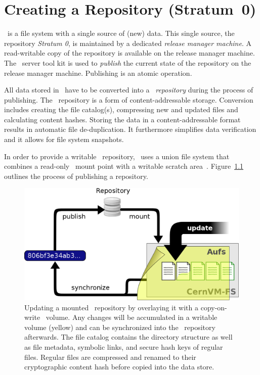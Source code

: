 \chapter{Creating a Repository (Stratum~0)}
\label{sct:createrepo}

\cvmfs\ is a file system with a single source of (new) data.
This single source, the repository \emph{Stratum 0}, is maintained by a dedicated \emph{release manager machine}.
A read-writable copy of the repository is available on the release manager machine.
The \cvmfs\ server tool kit is used to \emph{publish} the current state of the repository on the release manager machine.
Publishing is an atomic operation.

All data stored in \cvmfs\ have to be converted into a \cvmfs\ \emph{repository} during the process of publishing.
The \cvmfs\ repository is a form of content-addressable storage.
Conversion includes creating the file catalog(s), compressing new and updated files and calculating content hashes.
Storing the data in a content-addressable format results in automatic file de-duplication.
It furthermore simplifies data verification and it allows for file system snapshots.

In order to provide a writable \cvmfs\ repository, \cvmfs\ uses a union file system that combines a read-only \cvmfs\ mount point with a writable scratch area~\cite{unionfs04,aufs}.
Figure~\ref{fig:installwebserver} outlines the process of publishing a repository.

\begin{figure}[h]
	\includegraphics[width=\textwidth]{figures/update_process.png}
	\caption{Updating a mounted \cvmfs\ repository by overlaying it with a copy-on-write \aufs\ volume. 
		Any changes will be accumulated in a writable volume (yellow) and can be synchronized into the \cvmfs\ repository afterwards. 
		The file catalog contains the directory structure as well as file metadata, symbolic links, and secure hash keys of regular files. 
		Regular files are compressed and renamed to their cryptographic content hash before copied into the data store.}
	\label{fig:installwebserver}
\end{figure}

